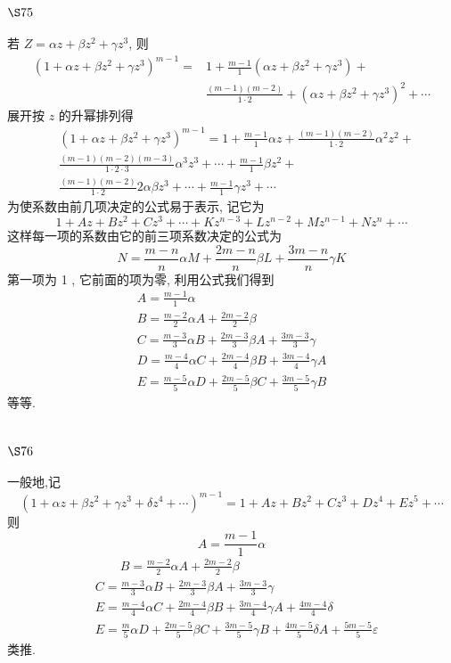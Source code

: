 \section{$\S 75$}

若 $Z=\alpha z+\beta z^{2}+\gamma z^{3}$, 则
\[
\begin{aligned}
\left(1+\alpha z+\beta z^{2}+\gamma z^{3}\right)^{m-1}= & 1+\frac{m-1}{1}\left(\alpha z+\beta z^{2}+\gamma z^{3}\right)+ \\
& \frac{(m-1)(m-2)}{1 \cdot 2}+\left(\alpha z+\beta z^{2}+\gamma z^{3}\right)^{2}+\cdots
\end{aligned}
\]
展开按 $z$ 的升幂排列得
\[
\begin{aligned}
& \left(1+\alpha z+\beta z^{2}+\gamma z^{3}\right)^{m-1}=1+\frac{m-1}{1} \alpha z+\frac{(m-1)(m-2)}{1 \cdot 2} \alpha^{2} z^{2}+ \\
& \frac{(m-1)(m-2)(m-3)}{1 \cdot 2 \cdot 3} \alpha^{3} z^{3}+\cdots+\frac{m-1}{1} \beta z^{2}+ \\
& \frac{(m-1)(m-2)}{1 \cdot 2} 2 \alpha \beta z^{3}+\cdots+\frac{m-1}{1} \gamma z^{3}+\cdots
\end{aligned}
\]
为使系数由前几项决定的公式易于表示, 记它为
\[
1+A z+B z^{2}+C z^{3}+\cdots+K z^{n-3}+L z^{n-2}+M z^{n-1}+N z^{n}+\cdots
\]
这样每一项的系数由它的前三项系数决定的公式为
\[
N=\frac{m-n}{n} \alpha M+\frac{2 m-n}{n} \beta L+\frac{3 m-n}{n} \gamma K
\]
第一项为 1 , 它前面的项为零, 利用公式我们得到
\[
\begin{gathered}
A=\frac{m-1}{1} \alpha \\
B=\frac{m-2}{2} \alpha A+\frac{2 m-2}{2} \beta \\
C=\frac{m-3}{3} \alpha B+\frac{2 m-3}{3} \beta A+\frac{3 m-3}{3} \gamma \\
D=\frac{m-4}{4} \alpha C+\frac{2 m-4}{4} \beta B+\frac{3 m-4}{4} \gamma A \\
E=\frac{m-5}{5} \alpha D+\frac{2 m-5}{5} \beta C+\frac{3 m-5}{5} \gamma B
\end{gathered}
\]
等等.

\section{$\S 76$}

一般地,记
\[
\left(1+\alpha z+\beta z^{2}+\gamma z^{3}+\delta z^{4}+\cdots\right)^{m-1}=1+A z+B z^{2}+C z^{3}+D z^{4}+E z^{5}+\cdots
\]
则
\[
A=\frac{m-1}{1} \alpha
\]
\[
\begin{aligned}
& \qquad B=\frac{m-2}{2} \alpha A+\frac{2 m-2}{2} \beta \\
& C=\frac{m-3}{3} \alpha B+\frac{2 m-3}{3} \beta A+\frac{3 m-3}{3} \gamma \\
& E=\frac{m-4}{4} \alpha C+\frac{2 m-4}{4} \beta B+\frac{3 m-4}{4} \gamma A+\frac{4 m-4}{4} \delta \\
& E=\frac{m}{5} \alpha D+\frac{2 m-5}{5} \beta C+\frac{3 m-5}{5} \gamma B+\frac{4 m-5}{5} \delta A+\frac{5 m-5}{5} \varepsilon
\end{aligned}
\]
类推.

